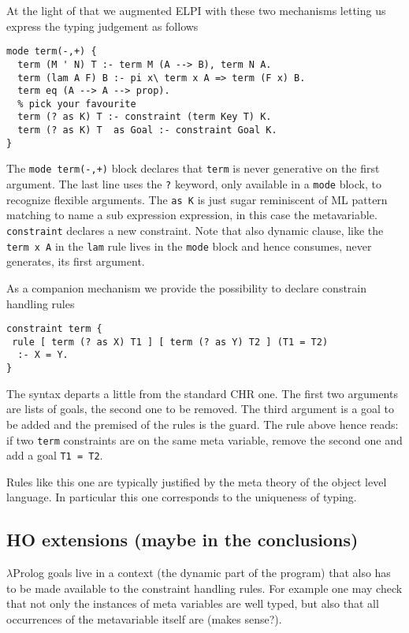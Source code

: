 \documentclass[preprint]{sigplanconf}
\begin{document}
At the light of that we augmented ELPI with these two mechanisms letting us
express the typing judgement as follows

{\small
\begin{verbatim}
mode term(-,+) {
  term (M ' N) T :- term M (A --> B), term N A.
  term (lam A F) B :- pi x\ term x A => term (F x) B.
  term eq (A --> A --> prop).
  % pick your favourite
  term (? as K) T :- constraint (term Key T) K.
  term (? as K) T  as Goal :- constraint Goal K.
}
\end{verbatim}
}

The \verb/mode term(-,+)/ block declares that \verb+term+
is never generative on the first argument.  The last line uses the \verb+?+
keyword, only available in a \verb+mode+ block, to recognize
flexible arguments.  The \verb+as K+ is just sugar reminiscent of ML
pattern matching to name a sub expression expression, in this case
the metavariable.  \verb+constraint+ declares a new constraint.
Note that also dynamic clause, like the \verb+term x A+ in the
\verb+lam+ rule lives in the \verb+mode+ block and hence
consumes, never generates, its first argument.

As a companion mechanism we provide the possibility to declare constrain
handling rules

{\small
\begin{verbatim}
constraint term {
 rule [ term (? as X) T1 ] [ term (? as Y) T2 ] (T1 = T2)
  :- X = Y.
}
\end{verbatim}
}

The syntax departs a little from the standard CHR one.  The first two
arguments are lists of goals, the second one to be removed.  The third argument
is a goal to be added and the premised of the rules is the guard. The rule
above hence reads: if two \verb+term+ constraints are on the same meta variable,
remove the second one and add a goal \verb+T1 = T2+.

Rules like this one are typically justified by the meta theory of the
object level language.  In particular this one corresponds to the uniqueness
of typing.

\subsection{HO extensions (maybe in the conclusions)}

$\lambda$Prolog goals live in a context (the dynamic part of the program)
that also has to be made available to
the constraint handling rules.  For example one may check that not only the
instances of meta variables are well typed, but also that all occurrences of the
metavariable itself are (makes sense?).
\end{document}
